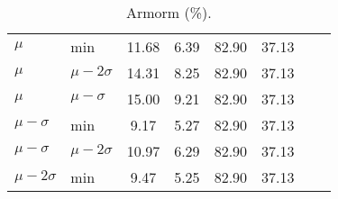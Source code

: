 \begin{table}[!t]
{\begin{tabular}{l l c c c c c c}
$\mu$           & min           & 11.68      & 6.39       & 82.90       & 37.13          \\
$\mu$           & $\mu-2\sigma$ & 14.31      & 8.25       & 82.90       & 37.13             \\
$\mu$           & $\mu-\sigma$  & 15.00      & 9.21       & 82.90       & 37.13             \\
$\mu-\sigma$    & min           & 9.17       & 5.27       & 82.90       & 37.13              \\
$\mu-\sigma$    & $\mu-2\sigma$ & 10.97      & 6.29       & 82.90       & 37.13           \\
$\mu-2\sigma$   & min           & 9.47       & 5.25       & 82.90       & 37.13           \\

\bottomrule
\end{tabular}
}
\caption{Armorm (\%).}
\label{results_main_skywork}
\vspace{-1em}
\end{table}
